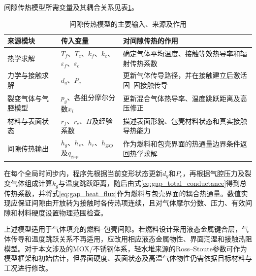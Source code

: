 
间隙传热模型所需变量及其耦合关系见表\ref{tab:gap_heat_transfer_coupling}。

\begin{table}[htbp]
	\centering
	\renewcommand{\arraystretch}{1.18}
	\caption{间隙传热模型的主要输入、来源及作用}
	\label{tab:gap_heat_transfer_coupling}
	\begin{tabularx}{\textwidth}{p{2.7cm}p{4cm}X}
		\toprule
		{\centering 来源模块\par} & {\centering 传入变量\par} & {\centering 对间隙传热的作用\par} \\
		\midrule
		热学求解 & $T_f$、$T_c$、$k_f$、$k_c$、$\varepsilon_f$、$\varepsilon_c$
		& 确定气体平均温度、接触等效热导率和辐射传热系数 \\
		力学与接触求解 & $d_g$、$P_c$
		& 更新气体传导路径，并在接触建立后激活固--固接触传导 \\
		裂变气体与气腔模型 & $p_g$、各组分摩尔分数$x_i$
		& 更新混合气体热导率、温度跳跃距离及高压修正 \\
		材料与表面状态 & $r_f$、$r_c$、$H$及经验系数
		& 描述表面形貌、包壳材料状态和真实接触导热能力 \\
		间隙传热输出 & $h_g$、$h_s$、$h_r$、$h_{\mathrm{gap}}$及$q_{\mathrm{gap}}$
		& 作为燃料和包壳界面的热通量边界条件返回热学求解 \\
		\bottomrule
	\end{tabularx}
\end{table}

在每个全局时间步内，程序先根据当前变形状态更新$d_g$和$P_c$，再根据气腔压力及裂变气体组成计算$k_g$与温度跳跃距离，随后由式\eqref{eq:gap_total_conductance}得到总传热系数，并将式\eqref{eq:gap_heat_flux}作为燃料与包壳界面的耦合热通量。数值实现应保证间隙由开放转为接触时各传热项连续，且对气体摩尔分数、压力、有效间隙和材料硬度设置物理范围检查。

上述模型适用于气体填充的燃料--包壳间隙。若燃料设计采用液态金属键合层，气体传导和温度跳跃关系不再适用，应改用相应液态金属物性、界面润湿和接触热阻模型。对于本文涉及的MOX/不锈钢体系，轻水堆来源的Ross--Stoute参数可作为模型框架和初始估计，但界面硬度、表面状态及高温气体物性仍需依据目标材料与工况进行修改。

\label{sec:sciantix_fission_gas_model}


